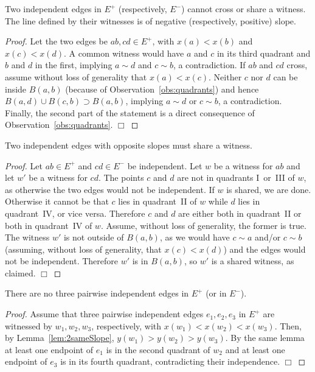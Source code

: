 \documentclass{llncs}
\begin{document}
\begin{lemma}
  \label{lem:2sameSlope}
  Two independent edges in $E^+$ (respectively, $E^-$) cannot cross or
  share a witness.  The line defined by their witnesses is of negative
  (respectively, positive) slope.
\end {lemma}
\begin{proof} Let the two edges be $ab,cd\in E^+$, with $x(a)<x(b)$
  and $x(c)<x(d)$.  A common witness would have $a$ and $c$ in its
  third quadrant and $b$ and $d$ in the first, implying $a\sim d$ and
  $c\sim b$, a contradiction.  If $ab$ and $cd$ cross, assume
  without loss of generality that $x(a)<x(c)$.  Neither $c$ nor $d$
  can be inside $B(a,b)$ (because of Observation~\ref{obs:quadrants})
  and hence $B(a,d)\cup B(c,b)\supset B(a,b)$, implying $a\sim d$ or
  $c\sim b$, a contradiction.  Finally, the second part of the
  statement is a direct consequence of
  Observation~\ref{obs:quadrants}. \hfill $\Box$
\end{proof}

\begin{lemma}
  \label{lem:2oppositeSlope}
  Two independent edges with opposite slopes must share a witness.
\end {lemma}
\begin{proof}
  Let $ab\in E^+$ and $cd \in E^-$ be independent.  Let $w$ be a
  witness for $ab$ and let $w'$ be a witness for $cd$.  The points $c$
  and $d$ are not in quadrants I~or~III of $w$, as otherwise the two
  edges would not be independent.
If $w$ is shared, we are done.  Otherwise it cannot be that $c$ lies
  in quadrant~II of $w$ while $d$ lies in quadrant~IV, or vice versa.
  Therefore $c$ and $d$ are either both in quadrant~II or both in
  quadrant~IV of $w$.  Assume, without loss of generality, the former
  is true.  The witness $w'$ is not outside of $B(a,b)$, as we would
  have $c \sim a$ and/or $c \sim b$ (assuming, without loss of
  generality, that $x(c)<x(d)$) and the edges would not be
  independent.  Therefore $w'$ is in $B(a,b)$, so $w'$ is a shared
  witness, as claimed. 
    \hspace*{0pt} \hfill $\Box$
\end{proof}




\begin{lemma}
  \label{lem:no3independentSameSlope}
  There are no three pairwise independent edges in $E^+$ (or in
  $E^-$).
\end{lemma}
\begin{proof} Assume that three pairwise independent edges $e_1, e_2,
  e_3$ in $E^+$ are witnessed by $w_1,w_2,w_3$, respectively, with
  $x(w_1)<x(w_2)<x(w_3)$.  Then, by Lemma~\ref{lem:2sameSlope},
  $y(w_1)>y(w_2)>y(w_3)$.  By the same lemma at least one endpoint of
  $e_1$ is in the second quadrant of $w_2$ and at least one endpoint
  of $e_3$ is in its fourth quadrant, contradicting their independence. \hfill $\Box$
\end{proof} 
\end{document}
